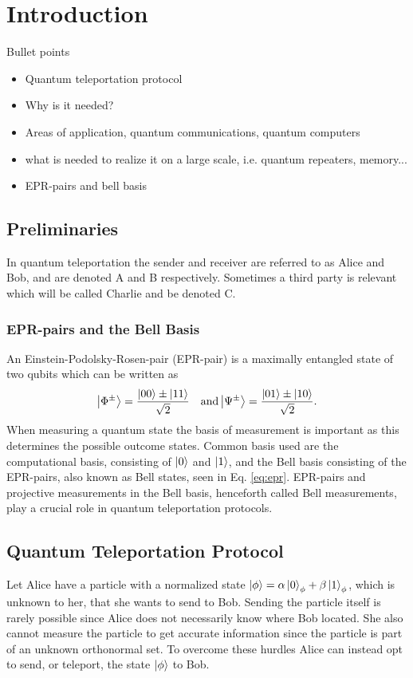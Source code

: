 \section{Introduction}
\begin{mybox}{Bullet points}
    \begin{itemize}
        \item Quantum teleportation protocol
        \item Why is it needed?
        \item Areas of application, quantum communications, quantum computers
        \item what is needed to realize it on a large scale, i.e. quantum repeaters, memory...
        \item EPR-pairs and bell basis
    \end{itemize}
\end{mybox}
\subsection{Preliminaries}
In quantum teleportation the sender and receiver are referred to as Alice and Bob, and are denoted A and B respectively. Sometimes a third party is relevant which will be called Charlie and be denoted C. \cite{Nielsen:2010}

\subsubsection{EPR-pairs and the Bell Basis}
An Einstein-Podolsky-Rosen-pair (EPR-pair) is a maximally entangled state of two qubits \cite{Nielsen:2010} which can be written as
\begin{equation}
    \ket{\Phi^\pm} = \frac{\ket{00} \pm \ket{11}}{\sqrt{2}} \quad \text{and} \ket{\Psi^\pm} = \frac{\ket{01} \pm \ket{10}}{\sqrt{2}}.\label{eq:epr}
\end{equation}
When measuring a quantum state the basis of measurement is important as this determines the possible outcome states. Common basis used are the computational basis, consisting of $\ket{0}$ and $\ket{1}$, and the Bell basis consisting of the EPR-pairs, also known as Bell states, seen in Eq. \eqref{eq:epr}. EPR-pairs and projective measurements in the Bell basis, henceforth called Bell measurements, play a crucial role in quantum teleportation protocols. \cite{Nielsen:2010}


\subsection{Quantum Teleportation Protocol}
Let Alice have a particle with a normalized state $\ket{\phi} = \alpha \ket{0}_\phi + \beta \ket{1}_\phi$, which is unknown to her, that she wants to send to Bob. Sending the particle itself is rarely possible since Alice does not necessarily know where Bob located. She also cannot measure the particle to get accurate information since the particle is part of an unknown orthonormal set. To overcome these hurdles Alice can instead opt to send, or teleport, the state $\ket{\phi}$ to Bob. \cite{Bennett:1993}

